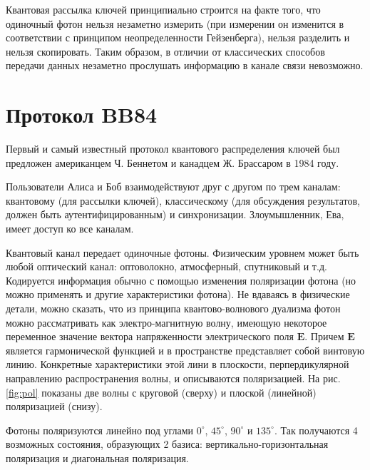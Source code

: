 \documentclass[a4paper,14pt]{extarticle}
\newcommand{\Vec}[1]{\mathbf{#1}}
\begin{document}
Квантовая рассылка ключей принципиально строится на факте того, что одиночный
фотон нельзя незаметно измерить (при измерении он изменится в соответствии с
принципом неопределенности Гейзенберга), нельзя разделить и нельзя скопировать.
Таким образом, в отличии от классических способов передачи данных незаметно
прослушать информацию в канале связи невозможно. 

\section{Протокол BB84}

Первый и самый известный протокол квантового распределения ключей был предложен
американцем Ч. Беннетом и канадцем Ж. Брассаром в 1984 году.

Пользователи Алиса и Боб взаимодействуют друг с другом по трем каналам:
квантовому (для рассылки ключей), классическому (для обсуждения результатов,
должен быть аутентифицированным) и синхронизации. Злоумышленник, Ева, имеет
доступ ко все каналам.

Квантовый канал передает одиночные фотоны. Физическим уровнем может быть любой
оптический канал: оптоволокно, атмосферный, спутниковый и т.д. Кодируется
информация обычно с помощью изменения поляризации фотона (но можно применять и
другие характеристики фотона). Не вдаваясь в физические детали, можно сказать,
что из принципа квантово-волнового дуализма фотон можно рассматривать как
электро-магнитную волну, имеющую некоторое переменное значение вектора
напряженности электрического поля $\Vec{E}$. Причем $\Vec{E}$ является
гармонической функцией и в пространстве представляет собой винтовую линию.
Конкретные характеристики этой лини в плоскости, перпердикулярной направлению
распространения волны, и описываются поляризацией. На рис. \ref{fig:pol}
показаны две волны с круговой (сверху) и плоской (линейной) поляризацией
(снизу).

Фотоны поляризуются линейно под углами $0^\circ$, $45^\circ$, $90^\circ$ и
$135^\circ$. Так получаются 4 возможных состояния, образующих 2 базиса:
вертикально-горизонтальная поляризация и диагональная поляризация.

\end{document}
